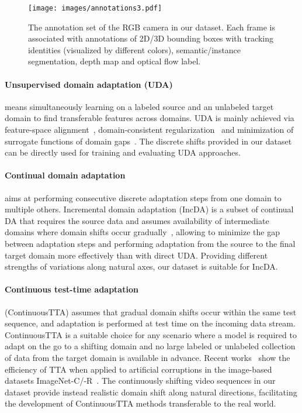 \begin{figure*}[!t]
    \centering
    \vspace{-1em}
    \texttt{[image: images/annotations3.pdf]}
    \caption{The annotation set of the RGB camera in our dataset. Each frame is associated with annotations of 2D/3D bounding boxes with tracking identities (visualized by different colors), semantic/instance segmentation, depth map and optical flow label. \label{figure:ann}}
\end{figure*}

\paragraph{Unsupervised domain adaptation (UDA)} means simultaneously learning on a labeled source and an unlabeled target domain to find transferable features across domains. UDA is mainly achieved via feature-space alignment~\cite{quinonero2008covariate, sun2017correlation}, domain-consistent regularization~\cite{ganin2015unsupervised, ganin2016domain,hoffman2018cycada} and minimization of surrogate functions of domain gaps~\cite{vu2019advent, saito2019semi}. The discrete shifts provided in our dataset can be directly used for training and evaluating UDA approaches.

\paragraph{Continual domain adaptation} aims at performing consecutive discrete adaptation steps from one domain to multiple others.
Incremental domain adaptation (IncDA) is a subset of continual DA that requires the source data and assumes availability of intermediate domains where domain shifts occur gradually~\cite{wang2020tent,volpi2021continual,lao2020continuous}, allowing to minimize the gap between adaptation steps and performing adaptation from the source to the final target domain more effectively than with direct UDA.
Providing different strengths of variations along natural axes, our dataset is suitable for IncDA.

\paragraph{Continuous test-time adaptation} (ContinuousTTA) assumes that gradual domain shifts occur within the same test sequence, and adaptation is performed at test time on the incoming data stream. 
ContinuousTTA is a suitable choice for any scenario where a model is required to adapt on the go to a shifting domain and no large labeled or unlabeled collection of data from the target domain is available in advance. 
Recent works~\cite{wang2020tent,mummadi2021test,sun2020test} show the efficiency of TTA when applied to artificial corruptions in the image-based datasets ImageNet-C/-R~\cite{hendrycks2019robustness,hendrycks2021many}. 
The continuously shifting video sequences in our dataset provide instead realistic domain shift along natural directions, facilitating the development of ContinuousTTA methods transferable to the real world.

